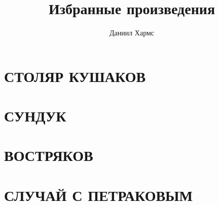 \documentclass[12pt]{book}
\title{Избранные произведения}
\author{Даниил Хармс}
\date{}
\begin{document}
	
	\maketitle
	
	\chapter{СТОЛЯР КУШАКОВ}
	
	
	\chapter{СУНДУК}
	
	
	\chapter{ВОСТРЯКОВ}
	
	
	\chapter{СЛУЧАЙ С ПЕТРАКОВЫМ}
	
	
\end{document}
